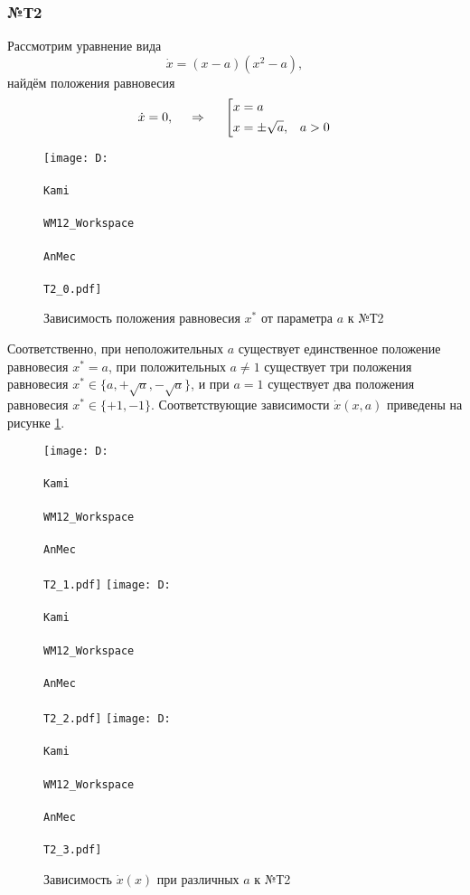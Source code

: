 \subsubsection*{№Т2}


Рассмотрим уравнение вида
\begin{equation*}
    \dot{x} = (x-a)(x^2-a),
\end{equation*}
найдём положения равновесия
\begin{equation*}
    \dot{x}=0,
    \hspace{0.5cm} \Rightarrow \hspace{0.5cm}
    \left[\begin{aligned}
        x &= a             & \\
        x &= \pm \sqrt{a},  &a > 0
    \end{aligned}\right.
\end{equation*}
\begin{figure}[ht]
    \centering
    \texttt{[image: D:\\\\Kami\\\\WM12\_Workspace\\\\AnMec\\\\T2\_0.pdf]}
    \caption{Зависимость положения равновесия $x^*$ от параметра $a$ к  №Т2}
\end{figure}
Соответственно, при неположительных $a$ существует единственное положение равновесия $x^*=a$, при положительных $a \neq 1$ существует три положения равновесия $x^* \in \{a, +\sqrt{a}, -\sqrt{a}\}$, и при $a=1$ существует два положения равновесия $x^* \in \{+1, -1\}$. Соответствующие зависимости $\dot{x}(x, a)$ приведены на рисунке \ref{IT2}.
\begin{figure}[ht]
    \centering
    \hspace{0.3cm}
    \texttt{[image: D:\\\\Kami\\\\WM12\_Workspace\\\\AnMec\\\\T2\_1.pdf]}
    \hspace{0.3cm}
    \texttt{[image: D:\\\\Kami\\\\WM12\_Workspace\\\\AnMec\\\\T2\_2.pdf]}
    \hspace{0.3cm}
    \texttt{[image: D:\\\\Kami\\\\WM12\_Workspace\\\\AnMec\\\\T2\_3.pdf]}
    \caption{Зависимость $\dot{x}(x)$ при различных $a$ к  №Т2}
    \label{IT2}
\end{figure}